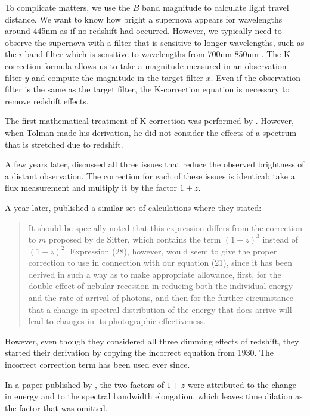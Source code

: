 To complicate matters, we use the $B$ band magnitude to calculate light travel
distance. We want to know how bright a supernova appears for wavelengths around
445nm as if no redshift had occurred. However, we typically need to observe the
supernova with a filter that is sensitive to longer wavelengths, such as the
$i$ band filter which is sensitive to wavelengths from 700nm-850nm
\citep{flaugher2015}. The K-correction formula allows us to take a magnitude
measured in an observation filter $y$ and compute the magnitude in the target
filter $x$. Even if the observation filter is the same as the target filter,
the K-correction equation is necessary to remove redshift effects.

The first mathematical treatment of K-correction was performed by
\citet{tolman1930}. However, when Tolman made his derivation, he did not
consider the effects of a spectrum that is stretched due to redshift.

A few years later, \citet{desitter1934} discussed all three issues that reduce
the observed brightness of a distant observation. The correction for each of
these issues is identical: take a flux measurement and multiply it by the
factor $1 + z$.

A year later, \citet{hubble1935} published a similar set of calculations where
they stated:

\begin{quote}
It should be specially noted that this expression differs from the correction
to $m$ proposed by de Sitter, which contains the term $(1 + z)^3$ instead of
$(1 + z)^2$. Expression (28), however, would seem to give the proper correction
to use in connection with our equation (21), since it has been derived in such
a way as to make appropriate allowance, first, for the double effect of nebular
recession in reducing both the individual energy and the rate of arrival of
photons, and then for the further circumstance that a change in spectral
distribution of the energy that does arrive will lead to changes in its
photographic effectiveness.
\end{quote}

\noindent However, even though they considered all three dimming effects of
redshift, they started their derivation by copying the incorrect equation from
1930. The incorrect correction term has been used ever since.

In a paper published by \citet{oke1968}, the two factors of ${1 + z}$ were
attributed to the change in energy and to the spectral bandwidth elongation,
which leaves time dilation as the factor that was omitted.

